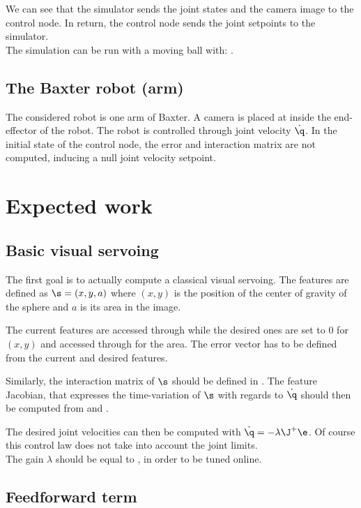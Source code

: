 \documentclass{ecnreport}
\begin{document}
We can see that the simulator sends the joint states and the camera image to the control node. In return, the control node sends the joint setpoints
to the simulator.\\

The simulation can be run with a moving ball with: .

\subsection{The Baxter robot (arm)}

The considered robot is one arm of Baxter. A camera is placed at inside the end-effector of the robot.
 The robot is controlled through joint velocity $\dot \q$.
 In the initial state of the control node, the error and interaction matrix are not computed, inducing a null joint velocity setpoint.
 
\section{Expected work}

\subsection{Basic visual servoing}

The first goal is to actually compute a classical visual servoing. The features are defined as $\s = (x, y, a)$ where $(x,y)$ is the position of the center of gravity of the sphere and $a$ is its area in the image.

The current features are accessed through  while the desired ones are set to 0 for $(x,y)$ and accessed through  for the area.
The error vector  has to be defined from the current and desired features.

Similarly, the interaction matrix of $\s$ should be defined in . The feature Jacobian, that expresses the time-variation of $\s$ with regards to $\dot \q$ should then be computed
from  and .

The desired joint velocities can then be computed with $\dot \q = -\lambda\J^+\e$. Of course this control law does not take into account the joint limits. \\The gain $\lambda$ should be equal to , in order to be tuned online.

\subsection{Feedforward term}
\end{document}
